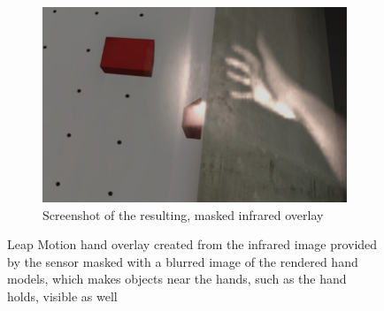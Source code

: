 \begin{figure}[ht]
\begin{subfigure}[t]{0.32\textwidth}
		\includegraphics[width=\textwidth]{include/images/leap-motion-overlay-result.jpg}
		\caption{Screenshot of the resulting, masked infrared overlay}
		\label{fig:leap-motion-overlay-result}
	\end{subfigure}
	\captionsetup{subrefformat=parens}
    \caption[Leap Motion hand tracking]{Leap Motion hand overlay created from the infrared image provided by the sensor  masked with a blurred image of the rendered hand models, which makes objects near the hands, such as the hand holds, visible as well }
    \label{fig:leap-motion-overlay}
\end{figure}
